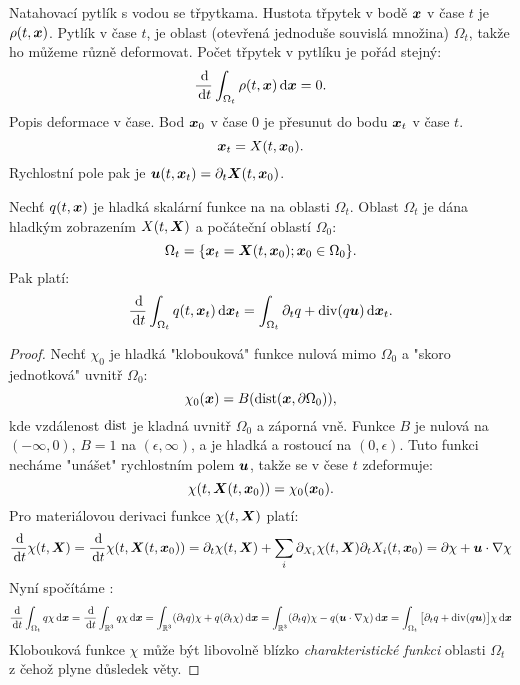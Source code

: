 Natahovací pytlík s vodou se třpytkama. Hustota třpytek v bodě $\mathbf{\boldsymbol{x}}$ v čase $t$ je $\rho(t,\mathbf{\boldsymbol{x}})$. Pytlík v čase $t$, je
oblast (otevřená jednoduše souvislá množina) $\Omega_t$, takže ho můžeme různě deformovat. Počet třpytek v pytlíku je pořád stejný:
\[
    \frac{\,{\rm d}}{\,{\rm d} t} \int_{\Omega_t} \rho(t,\mathbf{\boldsymbol{x}}) \,{\rm d} \mathbf{\boldsymbol{x}} =0.    
\]
Popis deformace v čase. Bod $\mathbf{\boldsymbol{x}}_0$ v čase $0$ je přesunut do bodu $\mathbf{\boldsymbol{x}}_t$ v čase $t$. 
\[
  \mathbf{\boldsymbol{x}}_t = X(t, \mathbf{\boldsymbol{x}}_0).
\]
Rychlostní pole pak je $\mathbf{\boldsymbol{u}}(t, \mathbf{\boldsymbol{x}}_t)= \partial_t \mathbf{\boldsymbol{X}}(t, \mathbf{\boldsymbol{x}}_0)$.

\begin{theorem}
Nechť $q(t, \mathbf{\boldsymbol{x}})$ je hladká skalární funkce na na oblasti $\Omega_t$. Oblast $\Omega_t$ je dána hladkým zobrazením $X(t, \mathbf{\boldsymbol{X}})$
a počáteční oblastí $\Omega_0$:
\[
    \Omega_t = \{\mathbf{\boldsymbol{x}}_t = \mathbf{\boldsymbol{X}}(t, \mathbf{\boldsymbol{x}}_0); \mathbf{\boldsymbol{x}}_0\in \Omega_0\}.
\]
Pak platí:
\begin{equation}
    \frac{\,{\rm d}}{\,{\rm d} t} \int_{\Omega_t} q(t,\mathbf{\boldsymbol{x}}_t) \,{\rm d} \mathbf{\boldsymbol{x}}_t = \int_{\Omega_t} \partial_t q + \operatorname{div}( q\mathbf{\boldsymbol{u}} ) \,{\rm d} \mathbf{\boldsymbol{x}}_t.
\end{equation}
\end{theorem}
\begin{proof}
Nechť $\chi_0$ je hladká "klobouková" funkce nulová mimo $\Omega_0$ a "skoro jednotková" uvnitř $\Omega_0$:
\[
    \chi_0(\mathbf{\boldsymbol{x}}) = B( {\rm dist}( \mathbf{\boldsymbol{x}} , \partial \Omega_0) ),
\]
 kde vzdálenost ${\rm dist}$ je kladná uvnitř $\Omega_0$ a záporná vně. Funkce $B$ je nulová na $(-\infty, 0)$, $B=1$ 
 na $(\epsilon, \infty)$, a je hladká a rostoucí na $(0,\epsilon)$.
Tuto funkci necháme "unášet" rychlostním polem $\mathbf{\boldsymbol{u}}$, takže se v čese $t$ zdeformuje:
\[
  \chi(t, \mathbf{\boldsymbol{X}}(t, \mathbf{\boldsymbol{x}}_0))=\chi_0(\mathbf{\boldsymbol{x}}_0).
\]
Pro materiálovou derivaci funkce $\chi(t, \mathbf{\boldsymbol{X}})$ platí:
\[
  \frac{\,{\rm d}}{\,{\rm d} t} \chi(t, \mathbf{\boldsymbol{X}}) = \frac{\,{\rm d}}{\,{\rm d} t} \chi(t, \mathbf{\boldsymbol{X}}(t, \mathbf{\boldsymbol{x}}_0))=\partial_t \chi(t, \mathbf{\boldsymbol{X}}) + \sum_i \partial_{X_i} \chi(t, \mathbf{\boldsymbol{X}}) \partial_t X_i(t, \mathbf{\boldsymbol{x}}_0)=
  \partial \chi + \mathbf{\boldsymbol{u}} \cdot \nabla \chi 
\]
Nyní spočítáme :
\[ 
    \frac{\,{\rm d}}{\,{\rm d} t} \int_{\Omega_t} q \chi \,{\rm d} \mathbf{\boldsymbol{x}} =
    \frac{\,{\rm d}}{\,{\rm d} t} \int_{{\mathbb R}^3} q \chi \,{\rm d} \mathbf{\boldsymbol{x}} =
    \int_{{\mathbb R}^3} (\partial_t q) \chi + q (\partial_t \chi) \,{\rm d} \mathbf{\boldsymbol{x}} =
    \int_{{\mathbb R}^3} (\partial_t q) \chi - q (\mathbf{\boldsymbol{u}} \cdot \nabla \chi) \,{\rm d} \mathbf{\boldsymbol{x}}=
    \int_{\Omega_t} \big[ \partial_t q + \operatorname{div}(q \mathbf{\boldsymbol{u}})\big] \chi \,{\rm d} \mathbf{\boldsymbol{x}}
\]
Klobouková funkce $\chi$ může být libovolně blízko \emph{charakteristické funkci} oblasti $\Omega_t$ z čehož plyne důsledek věty.

\end{proof}


